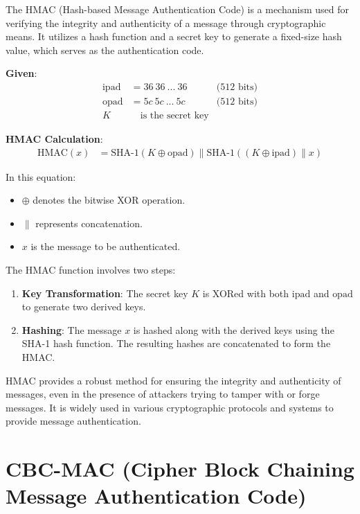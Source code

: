 \documentclass[11pt]{article}
\begin{document}
The HMAC (Hash-based Message Authentication Code) is a mechanism used for verifying the integrity and authenticity of a message through cryptographic means. It utilizes a hash function and a secret key to generate a fixed-size hash value, which serves as the authentication code.

\textbf{Given}:
\begin{align*}
\text{ipad} &= 36\ 36\ ...\ 36 \quad &\text{(512 bits)} \\
\text{opad} &= 5c\ 5c\ ...\ 5c \quad &\text{(512 bits)} \\
K & \quad \text{is the secret key}
\end{align*}

\textbf{HMAC Calculation}:
\begin{align*}
\text{HMAC}(x) &= \text{SHA-1}(K \oplus \text{opad}) \parallel \text{SHA-1}((K \oplus \text{ipad}) \parallel x)
\end{align*}

In this equation:
\begin{itemize}
    \item \( \oplus \) denotes the bitwise XOR operation.
    \item \( \parallel \) represents concatenation.
    \item \( x \) is the message to be authenticated.
\end{itemize}

The HMAC function involves two steps:
\begin{enumerate}
    \item \textbf{Key Transformation}: The secret key \( K \) is XORed with both \( \text{ipad} \) and \( \text{opad} \) to generate two derived keys.
    \item \textbf{Hashing}: The message \( x \) is hashed along with the derived keys using the SHA-1 hash function. The resulting hashes are concatenated to form the HMAC.
\end{enumerate}

HMAC provides a robust method for ensuring the integrity and authenticity of messages, even in the presence of attackers trying to tamper with or forge messages. It is widely used in various cryptographic protocols and systems to provide message authentication.


\section*{CBC-MAC (Cipher Block Chaining Message Authentication Code)}
\end{document}
